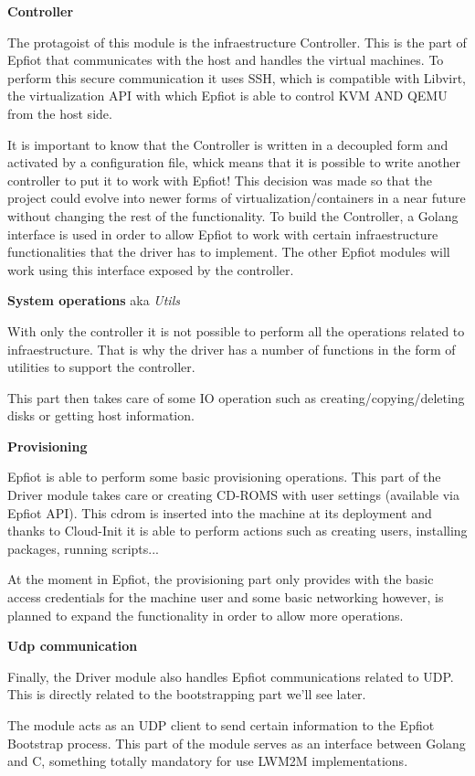 \textbf{Controller}

The protagoist of this module is the infraestructure Controller. This is the part of Epfiot that communicates with the host and handles the virtual machines. To perform this secure communication it uses SSH, which is compatible with Libvirt, the virtualization API with which Epfiot is able to control KVM AND QEMU from the host side.

It is important to know that the Controller is written in a decoupled form and activated by a configuration file, whick means that it is possible to write another controller to put it to work with Epfiot!
This decision was made so that the project could evolve into newer forms of virtualization/containers in a near future without changing the rest of the functionality.
To build the Controller, a Golang interface is used in order to allow Epfiot to work with certain infraestructure functionalities that the driver has to implement.
The other Epfiot modules will work using this interface exposed by the controller.

\textbf{System operations} aka \textit{Utils}

With only the controller it is not possible to perform all the operations related to infraestructure. That is why the driver has a number of functions in the form of utilities to support the controller.

This part then takes care of some IO operation such as creating/copying/deleting disks or getting host information.

\textbf{Provisioning}

Epfiot is able to perform some basic provisioning operations. This part of the Driver module takes care or creating CD-ROMS with user settings (available via Epfiot API). This cdrom is inserted into the machine at its deployment and thanks to Cloud-Init it is able to perform actions such as creating users, installing packages, running scripts...

At the moment in Epfiot, the provisioning part only provides with the basic access credentials for the machine user and some basic networking however, is planned to expand the functionality in order to allow more operations.

\textbf{Udp communication}

Finally, the Driver module also handles Epfiot communications related to UDP. This is directly related to the bootstrapping part we'll see later.

The module acts as an UDP client to send certain information to the Epfiot Bootstrap process. This part of the module serves as an interface between Golang and C, something totally mandatory for use LWM2M implementations.

